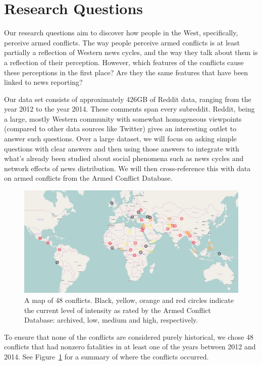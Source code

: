 \section{Research Questions}
Our research questions aim to discover how people in the West, specifically, perceive armed conflicts. The way people perceive armed conflicts is at least partially a reflection of Western news cycles, and the way they talk about them is a reflection of their perception. However, which features of the conflicts cause these perceptions in the first place? Are they the same features that have been linked to news reporting?

Our data set consists of approximately 426GB of Reddit data, ranging from the year 2012 to the year 2014. These comments span every subreddit. Reddit, being a large, mostly Western community with somewhat homogeneous viewpoints (compared to other data sources like Twitter) gives an interesting outlet to answer such questions. Over a large dataset, we will focus on asking simple questions with clear answers and then using those answers to integrate with what's already been studied about social phenomena such as news cycles and network effects of news distribution. We will then cross-reference this with data on armed conflicts from the Armed Conflict Database. 

\begin{figure}
\centering
\includegraphics[width=0.9\columnwidth]{map}
\caption{A map of 48 conflicts. Black, yellow, orange and red circles indicate the current level of intensity as rated by the Armed Conflict Database: archived, low, medium and high, respectively.}
\label{conflicts}
\end{figure}

To ensure that none of the conflicts are considered purely historical, we chose 48 conflicts that had nonzero fatalities in at least one of the years between 2012 and 2014. See Figure~\ref{conflicts} for a summary of where the conflicts occurred. 

